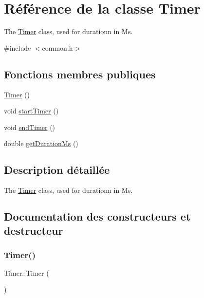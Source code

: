 \hypertarget{class_timer}{}\section{Référence de la classe Timer}
\label{class_timer}


The \hyperlink{class_timer}{Timer} class, used for durationn in Ms.  




{\ttfamily \#include $<$common.\+h$>$}

\subsection*{Fonctions membres publiques}
\begin{DoxyCompactItemize}
\item 
\hyperlink{class_timer_a5f16e8da27d2a5a5242dead46de05d97}{Timer} ()
\item 
void \hyperlink{class_timer_aa8c887576ec3b0d68c10ebf4097c367c}{start\+Timer} ()
\item 
void \hyperlink{class_timer_aef101eede3d1689a55f25f7164ecafcd}{end\+Timer} ()
\item 
double \hyperlink{class_timer_ae6476c32878861cb4d0a3e650bbe9b6c}{get\+Duration\+Ms} ()
\end{DoxyCompactItemize}


\subsection{Description détaillée}
The \hyperlink{class_timer}{Timer} class, used for durationn in Ms. 

\subsection{Documentation des constructeurs et destructeur}
\mbox{\label{class_timer_a5f16e8da27d2a5a5242dead46de05d97}} 
\subsubsection{\texorpdfstring{Timer()}{Timer()}}
{\footnotesize\ttfamily Timer\+::\+Timer (\begin{DoxyParamCaption}{ }\end{DoxyParamCaption})\hspace{0.3cm}{\ttfamily [inline]}}




